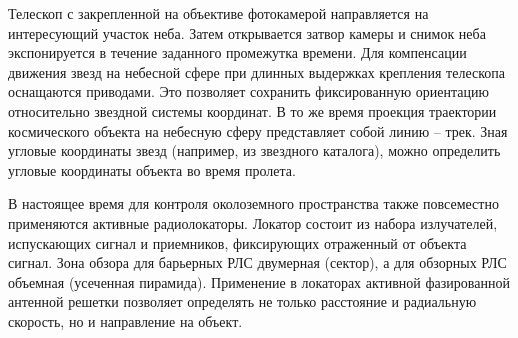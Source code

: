 Телескоп с закрепленной на объективе фотокамерой направляется на интересующий участок неба.
Затем открывается затвор камеры и снимок неба экспонируется в течение заданного промежутка времени.
Для компенсации движения звезд на небесной сфере при длинных выдержках крепления телескопа
оснащаются приводами. Это позволяет сохранить фиксированную ориентацию относительно звездной системы координат.
В то же время проекция траектории космического объекта на небесную сферу представляет собой линию -- трек.
Зная угловые координаты звезд (например, из звездного каталога), можно определить угловые координаты объекта во время пролета.

В настоящее время для контроля околоземного пространства также повсеместно применяются активные радиолокаторы.
Локатор состоит из набора излучателей, испускающих сигнал и приемников, фиксирующих отраженный от объекта сигнал.
Зона обзора для барьерных РЛС двумерная (сектор), а для обзорных РЛС объемная (усеченная пирамида).
Применение в локаторах активной фазированной антенной решетки позволяет определять не только расстояние и 
радиальную скорость, но и направление на объект.